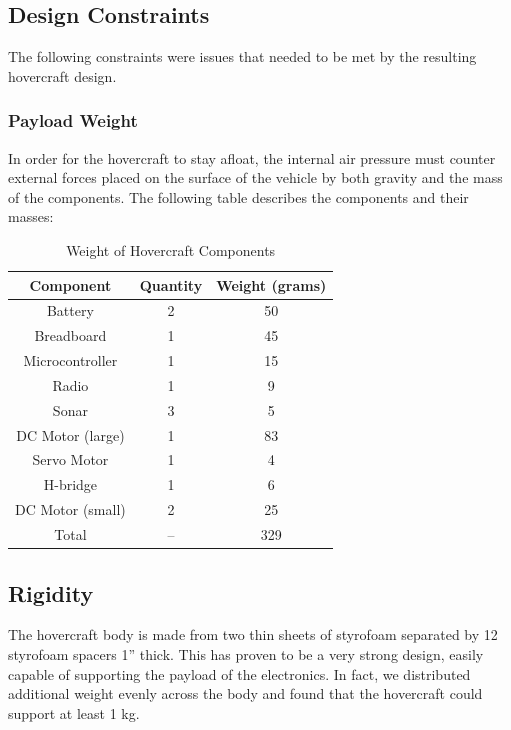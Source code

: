 \subsection{Design Constraints}
The following constraints were issues that needed to be met by the resulting hovercraft design.

\subsubsection{Payload Weight}
In order for the hovercraft to stay afloat, the internal air pressure must counter external forces placed on the surface of the vehicle by both gravity and the mass of the components. The following table describes the components and their masses:

\begin{table}
\caption{Weight of Hovercraft Components}
\begin{center}
\begin{tabular}{ c c c}
  Component & Quantity & Weight (grams) \\
  \hline
	Battery  &	2 & 	50 \\
	Breadboard &	1 &	45 \\
	Microcontroller &	1 &	15 \\
	Radio &	1 &	9 \\
	Sonar &	3 &	5 \\
	DC Motor (large) &	1 &	83 \\
	Servo Motor &	1 &	4 \\
	H-bridge &	1 &	6 \\
	DC Motor (small) &	2 &	25 \\
	Total &	-- &	329 \\
\end{tabular}
\end{center}
\label{restingTable}
\end{table}

\subsection{Rigidity}
The hovercraft body is made from two thin sheets of styrofoam separated by 12 styrofoam spacers 1'' thick. This has proven to be a very strong design, easily capable of supporting the payload of the electronics. In fact, we distributed additional weight evenly across the body and found that the hovercraft could support at least 1 kg.

